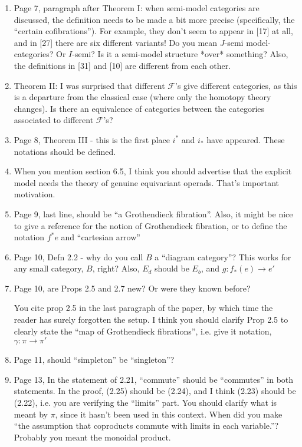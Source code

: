 \documentclass{article}
\begin{document}
\begin{enumerate}
\item
Page 7, paragraph after Theorem I: when semi-model categories are discussed, the definition needs to be made a bit more precise (specifically, the ``certain cofibrations''). For example, they don't seem to appear in [17] at all, and in [27] there are six different variants! Do you mean $J$-semi model-categories? Or $I$-semi? Is it a semi-model structure *over* something? Also, the definitions in [31] and [10] are different from each other.

\item
Theorem II: I was surprised that different $\mathcal{F}$'s give different categories, as this is a departure from the classical case (where only the homotopy theory changes). Is there an equivalence of categories between the categories associated to different $\mathcal{F}$'s?


\item
Page 8, Theorem III - this is the first place $i^*$ and $i_*$ have appeared. These notations should be defined.

\item
When you mention section 6.5, I think you should advertise that the explicit model needs the theory of genuine equivariant operads. That's important motivation.

\item
Page 9, last line, should be ``a Grothendieck fibration''. Also, it might be nice to give a reference for the notion of Grothendieck fibration, or to define the notation $f^*e$ and ``cartesian arrow''

\item
Page 10, Defn 2.2 - why do you call $B$ a ``diagram category''? This works for any small category, $B$, right? Also, $E_d$ should be $E_b$, and $g: f_*(e) \to e'$


\item
Page 10, are Props 2.5 and 2.7 new? Or were they known before?

You cite prop 2.5 in the last paragraph of the paper, by which time the reader has surely forgotten the setup. I think you should clarify Prop 2.5 to clearly state the ``map of Grothendieck fibrations'', i.e. give it notation, $\gamma \colon \pi \to \pi'$


\item
Page 11, should ``simpleton'' be ``singleton''?


\item
Page 13, In the statement of 2.21, ``commute'' should be ``commutes'' in both statements.
In the proof, (2.25) should be (2.24), and I think (2.23) should be (2.22), i.e. you are verifying the ``limits'' part. 
You should clarify what is meant by $\pi$, since it hasn't been used in this context.
When did you make ``the assumption that coproducts commute with limits in each variable.''? Probably you meant the monoidal product.


\end{enumerate}
\end{document}
